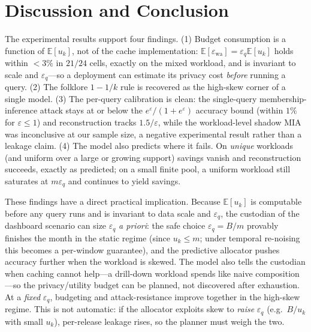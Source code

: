 \documentclass[sigconf,nonacm]{acmart}
\newcommand{\eps}{\varepsilon}
\newcommand{\E}{\mathbb{E}}
\begin{document}
\section{Discussion and Conclusion}
\label{sec:discussion}

The experimental results support four findings. (1) Budget consumption is a function of $\E[u_k]$, not of the cache implementation: $\E[\eps_{\mathrm{wa}}]=\eps_q\E[u_k]$ holds within $<3\%$ in $21/24$ cells, exactly on the mixed workload, and is invariant to scale and $\eps_q$---so a deployment can estimate its privacy cost \emph{before} running a query. (2) The folklore $1-1/k$ rule is recovered as the high-skew corner of a single model. (3) The per-query calibration is clean: the single-query membership-inference attack stays at or below the $e^\eps/(1+e^\eps)$ accuracy bound (within $1\%$ for $\eps\le1$) and reconstruction tracks $1.5/\eps$, while the workload-level shadow MIA was inconclusive at our sample size, a negative experimental result rather than a leakage claim. (4) The model also predicts where it fails. On \emph{unique} workloads (and uniform over a large or growing support) savings vanish and reconstruction succeeds, exactly as predicted; on a small finite pool, a uniform workload still saturates at $m\eps_q$ and continues to yield savings.

These findings have a direct practical implication. Because $\E[u_k]$ is computable before any query runs and is invariant to data scale and $\eps_q$, the custodian of the dashboard scenario can size $\eps_q$ \emph{a priori}: the safe choice $\eps_q=B/m$ provably finishes the month in the static regime (since $u_k\le m$; under temporal re-noising this becomes a per-window guarantee), and the predictive allocator pushes accuracy further when the workload is skewed. The model also tells the custodian when caching cannot help---a drill-down workload spends like naive composition---so the privacy/utility budget can be planned, not discovered after exhaustion. At a \emph{fixed} $\eps_q$, budgeting and attack-resistance improve together in the high-skew regime. This is not automatic: if the allocator exploits skew to \emph{raise} $\eps_q$ (e.g.\ $B/u_k$ with small $u_k$), per-release leakage rises, so the planner must weigh the two.
\end{document}
